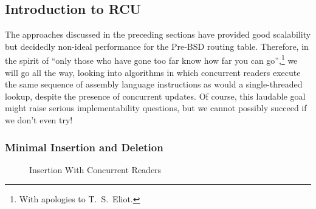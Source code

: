
\subsection{Introduction to RCU}
\label{sec:defer:Introduction to RCU}

The approaches discussed in the preceding sections have provided
good scalability but decidedly non-ideal performance for the
Pre-BSD routing table.
Therefore, in the spirit of ``only those who have gone too far
know how far you can go'',\footnote{
	With apologies to T.~S.~Eliot.}
we will go all the way, looking into algorithms in which concurrent
readers execute the same sequence of assembly language instructions as
would a single-threaded lookup, despite the presence of concurrent
updates.
Of course, this laudable goal might raise serious implementability
questions, but we cannot possibly succeed if we don't even try!

\subsubsection{Minimal Insertion and Deletion}
\label{sec:defer:Minimal Insertion and Deletion}

\begin{figure}
\centering
{}
\caption{Insertion With Concurrent Readers}
\label{fig:defer:Insertion With Concurrent Readers}
\end{figure}

